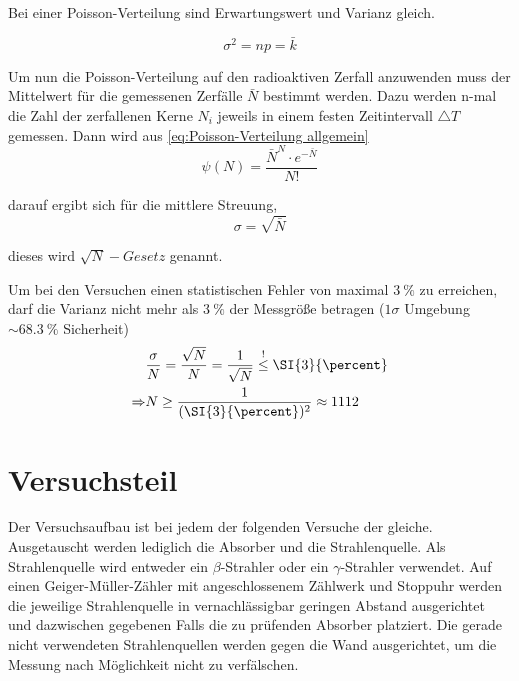 Bei einer Poisson-Verteilung sind Erwartungswert und Varianz gleich.

\begin{equation}
	\sigma^{2}=np=\bar{k}
\end{equation}


Um nun die Poisson-Verteilung auf den radioaktiven Zerfall anzuwenden
muss der Mittelwert für die gemessenen Zerfälle $\bar{N}$ bestimmt
werden. Dazu werden n-mal die Zahl der zerfallenen Kerne $N_{i}$
jeweils in einem festen Zeitintervall $\triangle T$ gemessen. Dann
wird aus \ref{eq:Poisson-Verteilung allgemein} 
\begin{equation}
	\psi(N)=\frac{\bar{N}^{N}\cdot e^{-\bar{N}}}{N!} \label{eq:pois_id}
\end{equation}


darauf ergibt sich für die mittlere Streuung,
\begin{equation}
\sigma=\sqrt{\bar{N}} \label{eq:std_abw}
\end{equation}


dieses wird $\sqrt{N}-Gesetz$ genannt.

Um  bei den Versuchen einen statistischen Fehler von maximal $ \SI{3}{\percent} $ zu erreichen, darf die Varianz nicht mehr als $ \SI{3}{\percent} $ der Messgröße betragen ($ 1\sigma $ Umgebung $ \sim \SI{68.3}{\percent} $ Sicherheit)
\begin{align}
	&\frac{\sigma}{N} = \frac{\sqrt{N}}{N} = \frac{1}{\sqrt{N}} \stackrel{!}{\leq} \SI{3}{\percent} \notag \\
	\Rightarrow & N \geq \frac{1}{(\SI{3}{\percent})^2} \approx 1112 \label{eq_n_pulszahl}
\end{align}


\newpage
\section{Versuchsteil}
Der Versuchsaufbau ist bei jedem der folgenden Versuche der gleiche. Ausgetauscht werden lediglich die Absorber und die Strahlenquelle. Als Strahlenquelle wird entweder ein  $ \beta $-Strahler oder ein  $ \gamma $-Strahler verwendet. Auf einen Geiger-Müller-Zähler mit angeschlossenem Zählwerk und Stoppuhr werden die jeweilige Strahlenquelle in vernachlässigbar geringen Abstand ausgerichtet und dazwischen gegebenen Falls die zu prüfenden Absorber platziert. Die gerade nicht verwendeten Strahlenquellen werden gegen die Wand ausgerichtet, um die Messung nach Möglichkeit nicht zu verfälschen.

